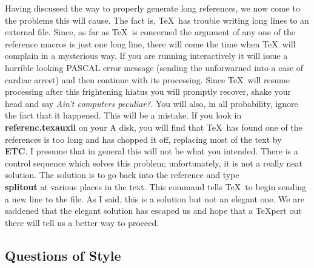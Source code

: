 Having discussed the way to properly generate long references, we
now come to the problems this will cause.
The fact is, \TeX\ has trouble writing long lines to
an external file.
Since, as far as \TeX\ is concerned the argument of any one of
the reference macros is just one long line, there will come the
time when \TeX\ will complain in a mysterious way.
If you are running interactively it will issue a horrible looking
PASCAL error message (sending the unforwarned into a case of
cardiac arrest) and then continue with its processing.
Since \TeX\ will resume processing after this frightening hiatus
you will promptly recover, shake your head and say {\it Ain't
computers peculiar?\/}.
You will also, in all probability, ignore the fact that it happened.
This will be a mistake.
If you look in {\bf referenc.texauxil} on your A disk, you will find
that \TeX\ has found one of the references is too long
and has chopped it off, replacing most of the text by
{\bf \\ETC}.
I presume that in general this will not be what you intended.
\nextline
{}\nextline
There is a control sequence which solves this problem; unfortunately,
it is not a really neat solution.
The solution is to go back into the reference and type
{\bf \\splitout} at various places in the text.
This command tells \TeX\ to begin sending a new line to the
file.
As I said, this is a solution but not an elegant one.
We are saddened that the elegant solution has escaped us and
hope that a \TeX pert out there will tell us a better way to proceed.
 
\subsection{Questions of Style}
 
